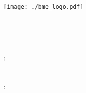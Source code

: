 \begin{titlepage}
  \begin{center}  
  \texttt{[image: ./bme\_logo.pdf]}
  \vspace{0.3cm}
  
  \bme \\
  \vik \\
  \viktanszek \\
  \vspace{5cm}
  
  \huge {\vikcim}
  \vspace{1.5cm}
  
  \large {\textbf{\vikdoktipus}}
  \vfill
    
  {\Large 
  	\keszitette: \\ \vspace{0.3cm}
  	\szerzo \\
	\tdkszerzoB \\
  	\vspace{1.5cm}
  	\konzulens: \\ \vspace{0.3cm}
  	\vikkonzulensA \\
  	\vikkonzulensB \\
  }
  
  \vspace{2cm}
  \large {\tdkev}
 \end{center}
\end{titlepage}
